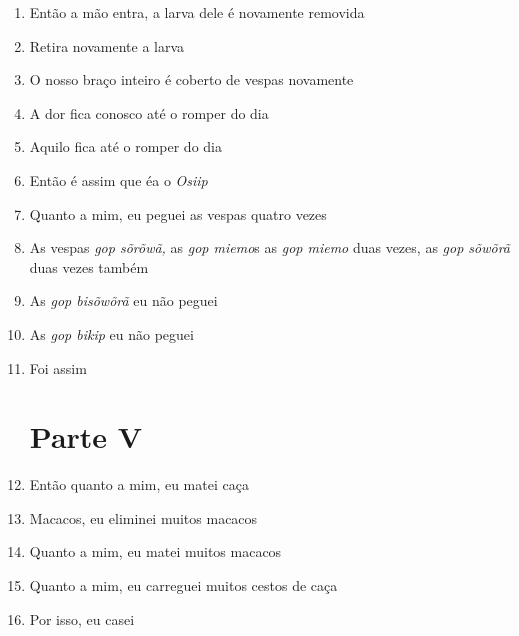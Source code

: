\begin{enumerate}
 \item Então a mão entra, a larva dele é novamente removida

 \item Retira novamente a larva

 \item O nosso braço inteiro é coberto de vespas novamente

 \item A dor fica conosco até o romper do dia

 \item Aquilo fica até o romper do dia

 \begin{center}\end{center}

 \item Então é assim que éa o \textit{Osiip}

 \item Quanto a mim, eu peguei as vespas quatro vezes

 \item As vespas \textit{gop sõrõwã,} as \textit{gop miemo}s as \textit{gop miemo} duas vezes, as \textit{gop sõwõrã} duas vezes também

 \item As \textit{gop bisõwõrã} eu não peguei

 \item As \textit{gop bikip} eu não peguei

 \item Foi assim

 \section{Parte V}

 \item Então quanto a mim, eu matei caça

 \item Macacos, eu eliminei muitos macacos

 \item Quanto a mim, eu matei muitos macacos

 \item Quanto a mim, eu carreguei muitos cestos de caça

 \begin{center}\end{center}

 \item Por isso, eu casei


\end{enumerate}
